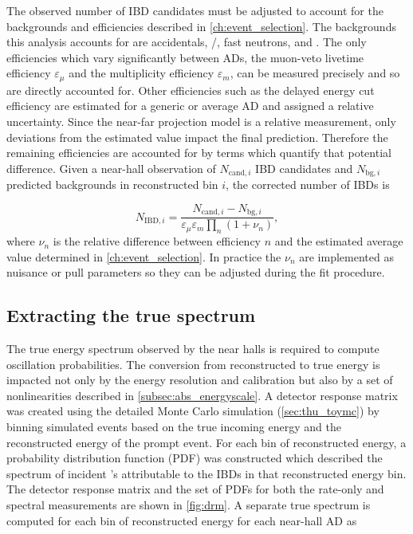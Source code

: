 The observed number of IBD candidates must be adjusted
to account for the backgrounds and efficiencies described in \cref{ch:event_selection}.
The backgrounds this analysis accounts for are
accidentals, \li{}/\he{}, fast neutrons, and \amc{}.
The only efficiencies which vary significantly between ADs,
the muon-veto livetime efficiency $\varepsilon_\mu$
and the multiplicity efficiency $\varepsilon_m$,
can be measured precisely and so are directly accounted for.
Other efficiencies such as the delayed energy cut efficiency
are estimated for a generic or average AD and assigned a relative uncertainty.
Since the near-far projection model is a relative measurement,
only deviations from the estimated value
impact the final prediction.
Therefore the remaining efficiencies are accounted for
by terms which quantify that potential difference.
Given a near-hall observation of $N_{\text{cand},i}$ IBD candidates
and $N_{\text{bg},i}$ predicted backgrounds in reconstructed bin $i$,
the corrected number of IBDs is

\begin{equation}
    N_{\text{IBD},i} =
    \frac{N_{\text{cand},i} - N_{\text{bg},i}}{\varepsilon_\mu\varepsilon_m\prod_n(1+\nu_n)},
\end{equation}
where $\nu_n$ is the relative difference between efficiency $n$
and the estimated average value determined in \cref{ch:event_selection}.
In practice the $\nu_n$ are implemented as nuisance or pull parameters
so they can be adjusted during the fit procedure.

\subsection{Extracting the true \texorpdfstring{\nuebar{}}{antineutrino} spectrum}
\label{subsec:reco_to_true_energy}

The true \nuebar{} energy spectrum observed by the near halls
is required to compute oscillation probabilities.
The conversion from reconstructed to true energy
is impacted not only by the energy resolution and calibration
but also by a set of nonlinearities described in \cref{subsec:abs_energyscale}.
A detector response matrix was created
using the detailed Monte Carlo simulation (\cref{sec:thu_toymc})
by binning simulated events based on the true incoming \nuebar{} energy
and the reconstructed energy of the prompt event.
For each bin of reconstructed energy,
a probability distribution function (PDF) was constructed
which described the spectrum of incident \nuebar{}'s
attributable to the IBDs in that reconstructed energy bin.
The detector response matrix and the set of PDFs
for both the rate-only and spectral measurements
are shown in \cref{fig:drm}.
A separate true \nuebar{} spectrum is computed
for each bin of reconstructed energy for each near-hall AD as

